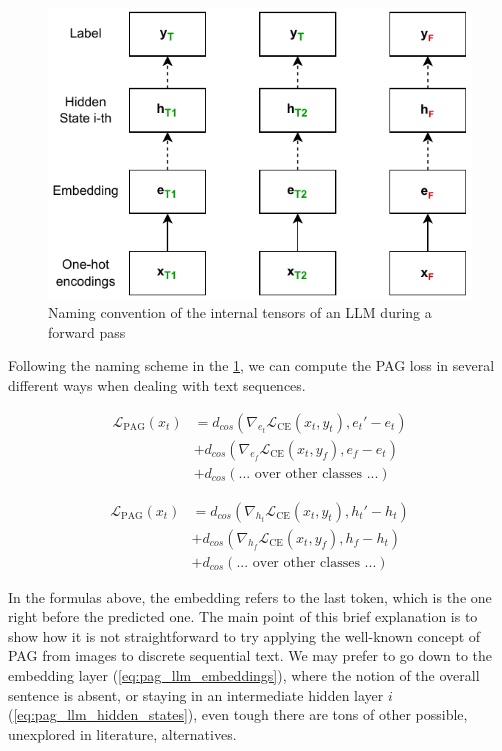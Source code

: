 \documentclass[../thesis.tex]{subfiles}
\begin{document}
\begin{figure}
    \centering
    \includegraphics[width=0.7\linewidth]{assets/pag/llm/llm_hidden_states_sample_namings.drawio.pdf}
    \caption{Naming convention of the internal tensors of an LLM during a forward pass}
    \label{fig:llm_hidden_states_sample_namings}
\end{figure}

Following the naming scheme in the \cref{fig:llm_hidden_states_sample_namings},
we can compute the PAG loss in several different ways when dealing with text sequences.

\begin{equation}
\begin{split}
\mathcal{L}_\text{PAG}(x_t) & = d_{cos}(
\nabla_{e_t} \mathcal{L}_\text{CE}(x_t, y_t),
e_t' - e_t
) \\
& + d_{cos}(
\nabla_{e_f} \mathcal{L}_\text{CE}(x_t, y_f),
e_f - e_t
) \\
& + d_{cos}(\text{... over other classes ...})
\end{split}
\label{eq:pag_llm_embeddings}
\end{equation}

\begin{equation}
\begin{split}
\mathcal{L}_\text{PAG}(x_t) & = d_{cos}(
\nabla_{h_t} \mathcal{L}_\text{CE}(x_t, y_t),
h_t' - h_t
) \\
& + d_{cos}(
\nabla_{h_f} \mathcal{L}_\text{CE}(x_t, y_f),
h_f - h_t
) \\
& + d_{cos}(\text{... over other classes ...})
\end{split}
\label{eq:pag_llm_hidden_states}
\end{equation}

In the formulas above, the embedding refers to the last token, which is the one right before the predicted one.
The main point of this brief explanation is to show how it is not straightforward to try applying the well-known concept of PAG from images to discrete sequential text.
We may prefer to go down to the embedding layer (\cref{eq:pag_llm_embeddings}), where the notion of the overall sentence is absent, or staying in an intermediate hidden layer $i$ (\cref{eq:pag_llm_hidden_states}), even tough there are tons of other possible, unexplored in literature, alternatives. 
\end{document}
